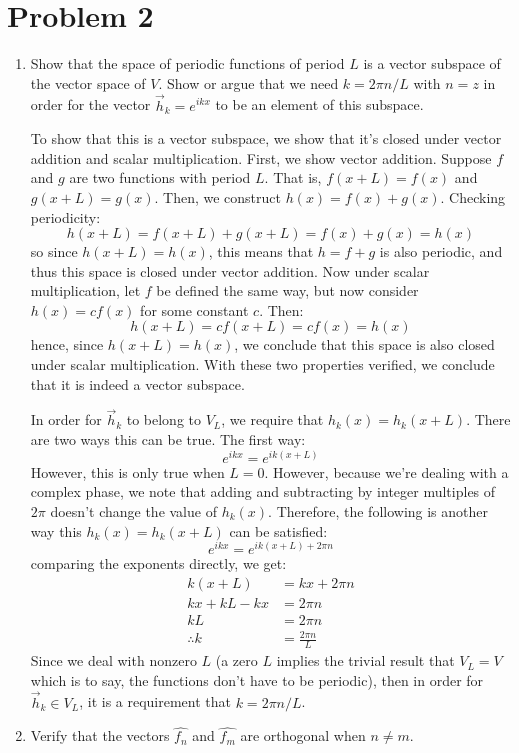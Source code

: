 \documentclass[10pt]{article}
\begin{document}
	\section*{Problem 2}
	\begin{enumerate}[label=\alph*)]
		\item Show that the space of periodic functions of period $L$ is a vector subspace of the 
			vector space of $V$. Show or argue that we need $k = 2 \pi n / L$ with $n = z$ in order for 
			the vector $\vec h_k = e^{ikx}$ to be an element of this subspace. 

			\begin{solution}
				To show that this is a vector subspace, we show that it's closed under vector addition and 
				scalar multiplication. First, we show vector addition. Suppose $f$ and $g$ are two functions
				with period $L$. That is, $f(x + L) = f(x)$ and $g(x+ L) = g(x)$. Then, we construct 
				$h(x) = f(x) + g(x)$. Checking periodicity:
				\[
					h(x + L) = f(x+L) + g(x + L) = f(x) + g(x) = h(x)
				\]
				so since $h(x+L) = h(x)$, this means that $h = f+g$ is also periodic, and thus this space
				is closed under vector addition. Now under scalar multiplication, let $f$ be defined the same 
				way, but now consider $h(x) = c f(x)$ for some constant $c$. Then:
				\[
				h(x+L) = cf(x+L) = cf(x) = h(x)
				\] 
				hence, since $h(x+L) = h(x)$, we conclude that this space is also closed under scalar 
				multiplication. With these two properties verified, we conclude that it is indeed
				a vector subspace.

				In order for $\vec h_k$ to belong to $V_L$, we require that $h_k(x) = h_k(x+L)$. There are two 
				ways this can be true. The first way:
				\[
					e^{ikx} = e^{ik(x + L)}
				\] 
				However, this is only true when $L = 0$. However, because we're dealing with a complex phase, 
				we note that adding and subtracting by integer multiples of $2\pi$ doesn't change the 
				value of $h_k(x)$. Therefore, the following is another way this $h_k(x) = h_k(x+L)$ can 
				be satisfied:
				\[
					e^{ikx} = e^{ik(x + L) + 2\pi n}
				\] 
				comparing the exponents directly, we get: 
				\begin{align*}
					k(x+L)&= kx + 2\pi n \\
					kx + kL - kx &= 2 \pi n\\
					kL &=  2 \pi n \\
					\therefore k &= \frac{2 \pi n}{L}
				\end{align*} 
				Since we deal with nonzero $L$ (a zero $L$ implies the trivial result that $V_L = V$ which
				is to say, the functions don't have to be periodic), then in
				order for $\vec h_k
				\in V_L$, it is a requirement that $k = 2 \pi n / L$. 
			\end{solution}
		\item Verify that the vectors $\hat{f_n}$ and $\hat{f_m}$ are orthogonal when $n \neq m$. 


\end{enumerate}
\end{document}

